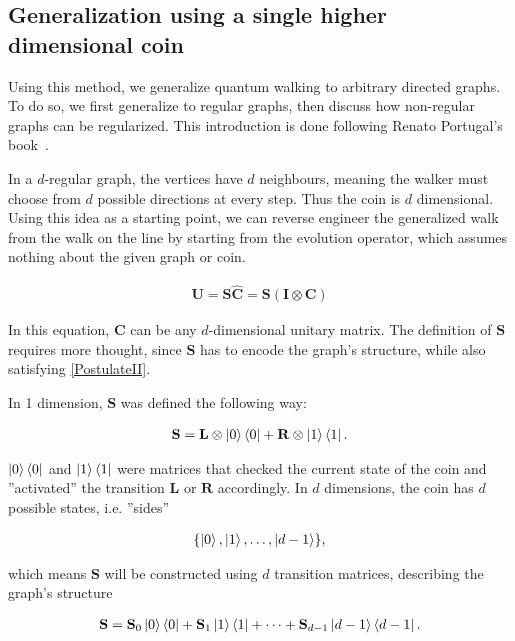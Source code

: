 \subsection{Generalization using a single higher dimensional coin}

Using this method, we generalize quantum walking to arbitrary directed graphs. To do so, we first generalize to regular graphs, then discuss how non-regular graphs can be regularized. This introduction is done following Renato Portugal's book~\cite{Portugal}.

In a $d$-regular graph, the vertices have $d$ neighbours, meaning the walker must choose from $d$ possible directions at every step. Thus the coin is $d$ dimensional. Using this idea as a starting point, we can reverse engineer the generalized walk from the walk on the line by starting from the evolution operator, which assumes nothing about the given graph or coin.

\begin{align*}
    \mathbf{U} = \mathbf{S} \mathbf{\hat{C}} = \mathbf{S} (\mathbf{I} \otimes \mathbf{C})
\end{align*}

In this equation, $\mathbf{C}$ can be any $d$-dimensional unitary matrix. The definition of $\mathbf{S}$ requires more thought, since $\mathbf{S}$ has to encode the graph's structure, while also satisfying \hyperref[PostulateII]{[PostulateII]}.

In 1 dimension, $\mathbf{S}$ was defined the following way:

\begin{align*}
\mathbf{S} = \mathbf{L}\otimes\ket{0}\bra{0} + \mathbf{R}\otimes\ket{1}\bra{1}.
\end{align*}

$\ket{0}\bra{0}$ and $\ket{1}\bra{1}$ were matrices that checked the current state of the coin and ''activated'' the transition $\mathbf{L}$ or $\mathbf{R}$ accordingly. In $d$ dimensions, the coin has $d$ possible states, i.e. ''sides''

\begin{align*}
    \{\ket{0}, \ket{1}, \dots, \ket{d-1}\},
\end{align*}

which means $\mathbf{S}$ will be constructed using $d$ transition matrices, describing the graph's structure

\begin{align*}
    \mathbf{S} = \mathbf{S}_0\ket{0}\bra{0} + \mathbf{S}_1\ket{1}\bra{1} + \dots + \mathbf{S}_{d-1}\ket{d-1}\bra{d-1}.
\end{align*}

